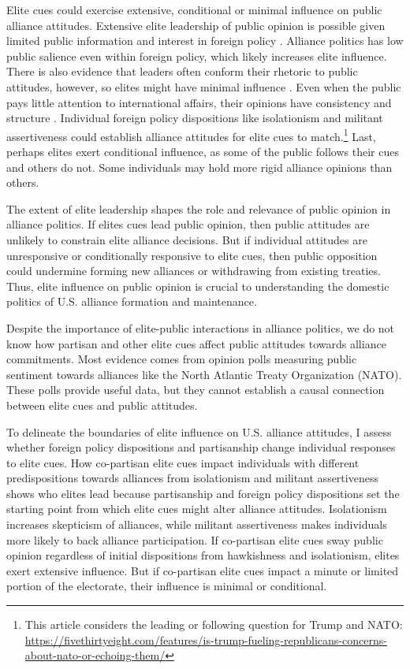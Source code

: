 \documentclass[12pt]{article}
\begin{document}
Elite cues could exercise extensive, conditional or minimal influence on public alliance attitudes. 
Extensive elite leadership of public opinion is possible given limited public information and interest in foreign policy \citep{Canes-Wrone2006, BaumPotter2008, Druckman2014}.
Alliance politics has low public salience even within foreign policy, which likely increases elite influence. 
There is also evidence that leaders often conform their rhetoric to public attitudes, however, so elites might have minimal influence  \citep{Barberaetal2019, HagerHilbig2020}.
Even when the public pays little attention to international affairs, their opinions have consistency and structure \citep{Holsti1992, PageShapiro1992}.
Individual foreign policy dispositions like isolationism and militant assertiveness \citep{Herrmannetal1999, KertzerZeitzoff2017} could establish alliance attitudes for elite cues to match.\footnote{This article considers the leading or following question for Trump and NATO: \url{https://fivethirtyeight.com/features/is-trump-fueling-republicans-concerns-about-nato-or-echoing-them/}}
Last, perhaps elites exert conditional influence, as some of the public follows their cues and others do not. 
Some individuals may hold more rigid alliance opinions than others.


The extent of elite leadership shapes the role and relevance of public opinion in alliance politics.
If elites cues lead public opinion, then public attitudes are unlikely to constrain elite alliance decisions.
But if individual attitudes are unresponsive or conditionally responsive to elite cues, then public opposition could undermine forming new alliances or withdrawing from existing treaties. 
Thus, elite influence on public opinion is crucial to understanding the domestic politics of U.S. alliance formation and maintenance.  


Despite the importance of elite-public interactions in alliance politics, we do not know how partisan and other elite cues affect public attitudes towards alliance commitments. 
Most evidence comes from opinion polls measuring public sentiment towards alliances like the North Atlantic Treaty Organization (NATO).
These polls provide useful data, but they cannot establish a causal connection between elite cues and public attitudes.


To delineate the boundaries of elite influence on U.S. alliance attitudes, I assess whether foreign policy dispositions and partisanship change individual responses to elite cues.
How co-partisan elite cues impact individuals with different predispositions towards alliances from isolationism and militant assertiveness shows who elites lead because partisanship and foreign policy dispositions set the starting point from which elite cues might alter alliance attitudes. 
Isolationism increases skepticism of alliances, while militant assertiveness makes individuals more likely to back alliance participation. 
If co-partisan elite cues sway public opinion regardless of initial dispositions from hawkishness and isolationism, elites exert extensive influence. 
But if co-partisan elite cues impact a minute or limited portion of the electorate, their influence is minimal or conditional.
\end{document}
